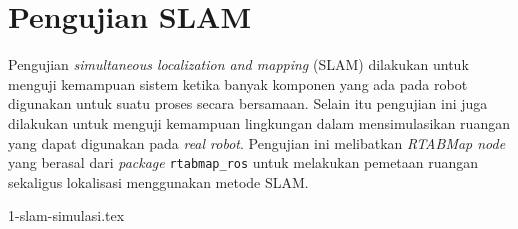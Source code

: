 \section{Pengujian SLAM}
\label{sec:pengujianslam}

Pengujian \emph{simultaneous localization and mapping} (SLAM) dilakukan untuk menguji kemampuan sistem ketika banyak komponen yang ada pada robot digunakan untuk suatu proses secara bersamaan.
Selain itu pengujian ini juga dilakukan untuk menguji kemampuan lingkungan dalam mensimulasikan ruangan yang dapat digunakan pada \emph{real robot}.
Pengujian ini melibatkan \emph{RTABMap node} yang berasal dari \emph{package} \lstinline{rtabmap_ros} untuk melakukan pemetaan ruangan sekaligus lokalisasi menggunakan metode SLAM.

{1-slam-simulasi.tex}
